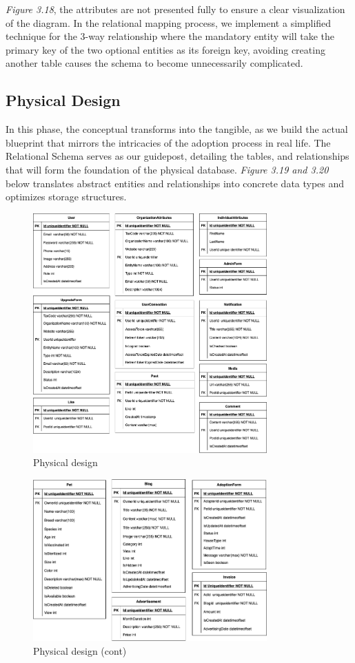 \emph{Figure 3.18}, the attributes are not presented fully to ensure a clear visualization of the diagram. In the relational mapping process, we implement a simplified technique for the 3-way relationship where the mandatory entity will take the primary key of the two optional entities as its foreign key, avoiding creating another table causes the schema to become unnecessarily complicated.

\subsection{Physical Design}

In this phase, the conceptual transforms into the tangible, as we build the actual blueprint that mirrors the intricacies of the adoption process in real life. The Relational Schema serves as our guidepost, detailing the tables, and relationships that will form the foundation of the physical database. \textit{Figure 3.19 and 3.20} below translates abstract entities and relationships into concrete data types and optimizes storage structures.

\begin {figure}[H]
\centering
\includegraphics[width=0.8\textwidth]{Figures/DatabaseDesign/Entities-Physical_1.png}
\caption{Physical design}
\end{figure}

\begin {figure}[H]
\centering
\includegraphics[width=0.8\textwidth]{Figures/DatabaseDesign/Entities-Physical_2.png}
\caption{Physical design (cont)}
\end{figure}




